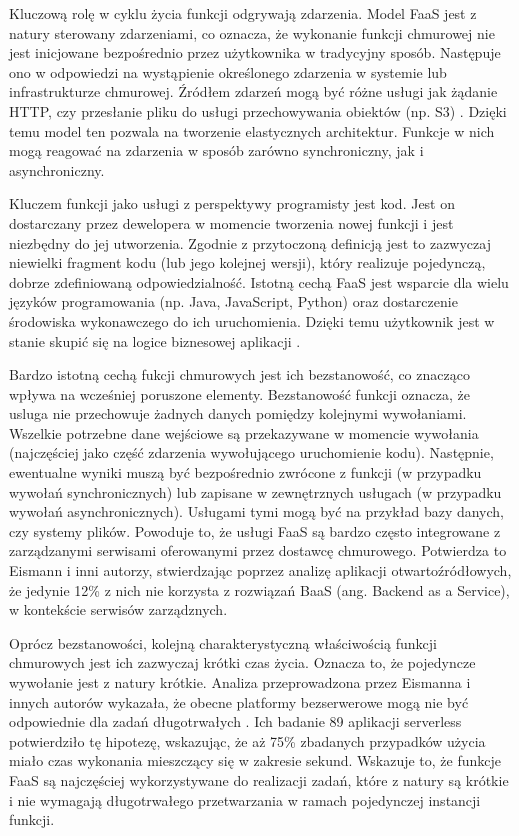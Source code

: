 Kluczową rolę w cyklu życia funkcji odgrywają zdarzenia.
Model FaaS jest z natury sterowany zdarzeniami, co oznacza, że wykonanie funkcji chmurowej nie jest inicjowane bezpośrednio przez użytkownika w tradycyjny sposób.
Następuje ono w odpowiedzi na wystąpienie określonego zdarzenia w systemie lub infrastrukturze chmurowej.
Źródłem zdarzeń mogą być różne usługi jak żądanie HTTP, czy przesłanie pliku do usługi przechowywania obiektów (np. S3) \cite{awsLambdaDocs}.
Dzięki temu model ten pozwala na tworzenie elastycznych architektur.
Funkcje w nich mogą reagować na zdarzenia w sposób zarówno synchroniczny, jak i asynchroniczny.

Kluczem funkcji jako usługi z perspektywy programisty jest kod.
Jest on dostarczany przez dewelopera w momencie tworzenia nowej funkcji i jest niezbędny do jej utworzenia.
Zgodnie z przytoczoną definicją jest to zazwyczaj niewielki fragment kodu (lub jego kolejnej wersji), który realizuje pojedynczą, dobrze zdefiniowaną odpowiedzialność.
Istotną cechą FaaS jest wsparcie dla wielu języków programowania (np. Java, JavaScript, Python) oraz dostarczenie środowiska wykonawczego do ich uruchomienia.
Dzięki temu użytkownik jest w stanie skupić się na logice biznesowej aplikacji \cite{ServerlessApplicationsWhyWhenAndHow}.

Bardzo istotną cechą fukcji chmurowych jest ich bezstanowość, co znacząco wpływa na wcześniej poruszone elementy.
Bezstanowość funkcji oznacza, że usluga nie przechowuje żadnych danych pomiędzy kolejnymi wywołaniami.
Wszelkie potrzebne dane wejściowe są przekazywane w momencie wywołania (najczęściej jako część zdarzenia wywołującego uruchomienie kodu).
Następnie, ewentualne wyniki muszą być bezpośrednio zwrócone z funkcji (w przypadku wywołań synchronicznych) lub zapisane w zewnętrznych usługach (w przypadku wywołań asynchronicznych).
Usługami tymi mogą być na przykład bazy danych, czy systemy plików. 
Powoduje to, że usługi FaaS są bardzo często integrowane z zarządzanymi serwisami oferowanymi przez dostawcę chmurowego.
Potwierdza to Eismann i inni autorzy, stwierdzając poprzez analizę aplikacji otwartoźródłowych, że jedynie 12\% z nich nie korzysta z rozwiązań BaaS (ang. Backend as a Service), w kontekście serwisów zarządznych.

Oprócz bezstanowości, kolejną charakterystyczną właściwością funkcji chmurowych jest ich zazwyczaj krótki czas życia.
Oznacza to, że pojedyncze wywołanie jest z natury krótkie.
Analiza przeprowadzona przez Eismanna i innych autorów wykazała, że obecne platformy bezserwerowe mogą nie być odpowiednie dla zadań długotrwałych \cite{ServerlessApplicationsWhyWhenAndHow}. 
Ich badanie 89 aplikacji serverless potwierdziło tę hipotezę, wskazując, że aż 75\% zbadanych przypadków użycia miało czas wykonania mieszczący się w zakresie sekund. 
Wskazuje to, że funkcje FaaS są najczęściej wykorzystywane do realizacji zadań, które z natury są krótkie i nie wymagają długotrwałego przetwarzania w ramach pojedynczej instancji funkcji.

